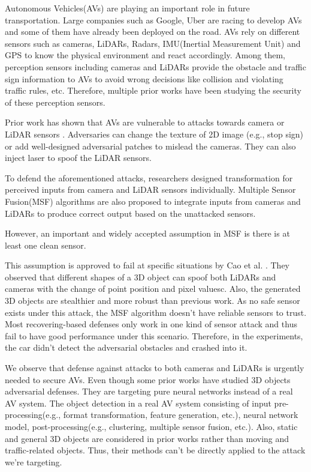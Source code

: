 Autonomous Vehicles(AVs) are playing an important role in
future transportation. Large companies such as Google,
Uber\cite{1} are racing to develop AVs and some of them have already been deployed on the road. 
AVs rely on different sensors\cite{17} such as cameras, LiDARs, Radars, IMU(Inertial
Measurement Unit) and GPS to know the physical environment and react accordingly. Among them, perception sensors
including cameras and LiDARs provide the obstacle and traffic sign information to AVs to avoid wrong decisions like
collision and violating traffic rules, etc. Therefore, multiple
prior works have been studying the security of these perception sensors.

Prior work has shown that AVs are vulnerable to attacks
towards camera \cite{7, 9, 23} or LiDAR sensors \cite{4, 6, 19, 25}.
Adversaries can change the texture of 2D image \cite{23}(e.g.,
stop sign) or add well-designed adversarial patches\cite{9} to
mislead the cameras. They can also inject laser\cite{6} to spoof
the LiDAR sensors.

To defend the aforementioned attacks, researchers designed
transformation for perceived inputs from camera\cite{13} and LiDAR\cite{22} sensors individually. Multiple Sensor Fusion(MSF)
algorithms are also proposed to integrate inputs from cameras and LiDARs to produce correct output based on the
unattacked sensors.

However, an important and widely accepted assumption in
MSF is there is at least one clean sensor\cite{msf-adv}.

This assumption is approved to fail at specific situations
by Cao et al. \cite{msf-adv}. They observed that different shapes of a 3D
object can spoof both LiDARs and cameras with the change
of point position and pixel valuesc\cite{msf-adv}. Also, the generated 3D
objects are stealthier and more robust than previous work. As
no safe sensor exists under this attack, the MSF algorithm doesn’t
have reliable sensors to trust. Most recovering-based defenses only work in one kind of sensor attack and thus fail to
have good performance under this scenario. Therefore, 
in the experiments, the car didn’t detect the adversarial obstacles and crashed into it.

We observe that defense against attacks to both cameras
and LiDARs is urgently needed to secure AVs. Even though
some prior works\cite{if-defense, 22, 24} have studied 3D objects adversarial defenses. They are targeting pure neural networks
instead of a real AV system. The object detection in a real AV
system consisting of input pre-processing(e.g., format transformation, feature generation, etc.), neural network model,
post-processing(e.g., clustering, multiple sensor fusion, etc.).
Also, static and general 3D objects are considered in prior
works rather than moving and traffic-related objects. Thus,
their methods can’t be directly applied to the attack we’re
targeting.

